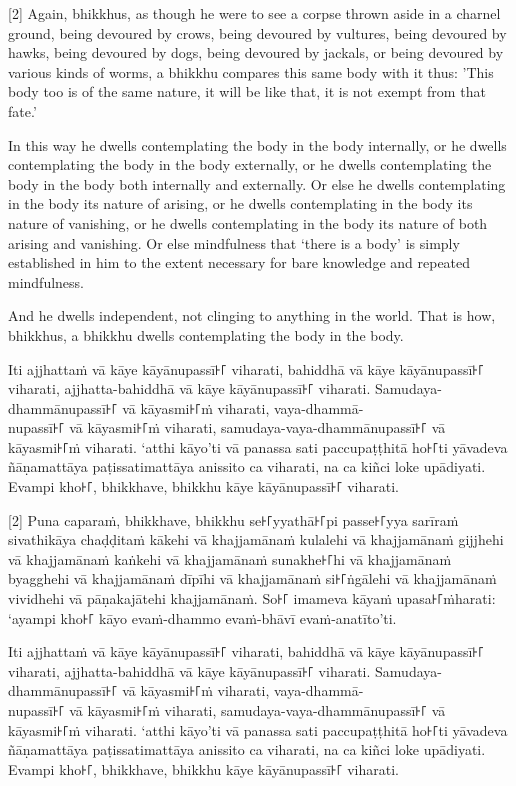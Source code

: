 [2] Again, bhikkhus, as though he were to see a corpse thrown aside in a charnel
ground, being devoured by crows, being devoured by vultures, being devoured by
hawks, being devoured by dogs, being devoured by jackals, or being devoured by
various kinds of worms, a bhikkhu compares this same body with it thus: 'This
body too is of the same nature, it will be like that, it is not exempt from that
fate.'

In this way he dwells contemplating the body in the body internally, or he
dwells contemplating the body in the body externally, or he dwells contemplating
the body in the body both internally and externally. Or else he dwells
contemplating in the body its nature of arising, or he dwells contemplating in
the body its nature of vanishing, or he dwells contemplating in the body its
nature of both arising and vanishing. Or else mindfulness that ‘there is a body’
is simply established in him to the extent necessary for bare knowledge and
repeated mindfulness.

And he dwells independent, not clinging to anything in the world. That is how,
bhikkhus, a bhikkhu dwells contemplating the body in the body.

\paliPage

Iti ajjhattaṁ vā kāye kāyānupassī꜔꜒ viharati, bahiddhā vā kāye kāyānupassī꜔꜒
viharati, ajjhatta-bahiddhā vā kāye kāyānupassī꜔꜒ viharati. Samudaya-dhammānupassī꜔꜒
vā kāyasmi꜔꜒ṁ viharati, vaya-dhammā-\\
nupassī꜔꜒ vā kāyasmi꜔꜒ṁ viharati, samudaya-vaya-dhammānupassī꜔꜒ vā kāyasmi꜔꜒ṁ viharati.
‘atthi kāyo’ti vā panassa sati paccupaṭṭhitā ho꜔꜒ti yāvadeva ñāṇamattāya
paṭissatimattāya anissito ca viharati, na ca kiñci loke upādiyati. Evampi kho꜔꜒,
bhikkhave, bhikkhu kāye kāyānupassī꜔꜒ viharati.

[2] Puna caparaṁ, bhikkhave, bhikkhu se꜔꜒yyathā꜔꜒pi passe꜔꜒yya sarīraṁ sivathikāya
chaḍḍitaṁ kākehi vā khajjamānaṁ kulalehi vā khajjamānaṁ gijjhehi vā khajjamānaṁ
kaṅkehi vā khajjamānaṁ sunakhe꜔꜒hi vā khajjamānaṁ byagghehi vā khajjamānaṁ dīpīhi
vā khajjamānaṁ si꜔꜒ṅgālehi vā khajjamānaṁ vividhehi vā pāṇakajātehi khajjamānaṁ.
So꜔꜒ imameva kāyaṁ upasa꜔꜒ṁharati: ‘ayampi kho꜔꜒ kāyo evaṁ-dhammo evaṁ-bhāvī
evaṁ-anatīto’ti.

Iti ajjhattaṁ vā kāye kāyānupassī꜔꜒ viharati, bahiddhā vā kāye kāyānupassī꜔꜒
viharati, ajjhatta-bahiddhā vā kāye kāyānupassī꜔꜒ viharati. Samudaya-dhammānupassī꜔꜒
vā kāyasmi꜔꜒ṁ viharati, vaya-dhammā-\\
nupassī꜔꜒ vā kāyasmi꜔꜒ṁ viharati, samudaya-vaya-dhammānupassī꜔꜒ vā kāyasmi꜔꜒ṁ viharati.
‘atthi kāyo’ti vā panassa sati paccupaṭṭhitā ho꜔꜒ti yāvadeva ñāṇamattāya
paṭissatimattāya anissito ca viharati, na ca kiñci loke upādiyati. Evampi kho꜔꜒,
bhikkhave, bhikkhu kāye kāyānupassī꜔꜒ viharati.

